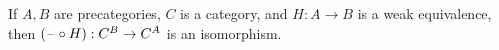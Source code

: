 \documentclass[hott-all.tex]{subfiles}
\begin{document}
\begin{thm}
  If $A,B$ are precategories, $C$ is a category, and $H:A\to B$ is a weak equivalence, then $(\mathord{\hspace{1pt}\text{--}\hspace{1pt}}\circ H):C^B \to C^A$ is an isomorphism.
\end{thm}
%
%
%
\end{document}
